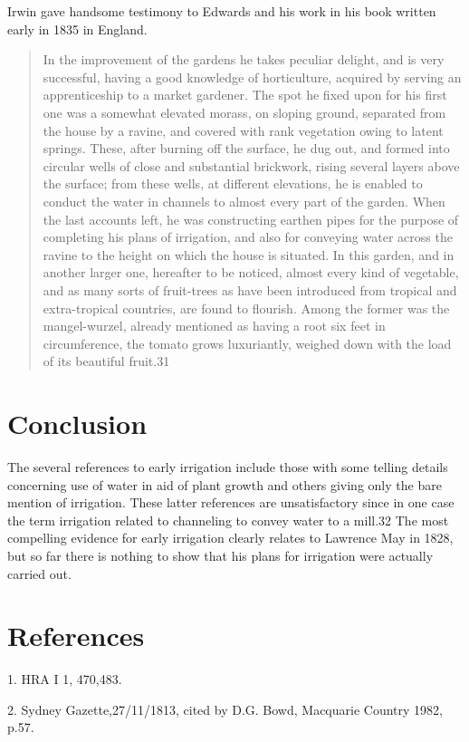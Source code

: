 Irwin gave handsome testimony to Edwards and his work in his book
written early in 1835 in England.
\begin{quote}
In the improvement of the gardens he takes peculiar delight, and is
very successful, having a good knowledge of horticulture, acquired by
serving an apprenticeship to a market gardener. The spot he fixed upon
for his first one was a somewhat elevated morass, on sloping ground,
separated from the house by a ravine, and covered with rank vegetation
owing to latent springs. These, after burning off the surface, he dug
out, and formed into circular wells of close and substantial
brickwork, rising several layers above the surface; from these wells,
at different elevations, he is enabled to conduct the water in
channels to almost every part of the garden. When the last accounts
left, he was constructing earthen pipes for the purpose of completing
his plans of irrigation, and also for conveying water across the
ravine to the height on which the house is situated. In this garden,
and in another larger one, hereafter to be noticed, almost every kind
of vegetable, and as many sorts of fruit-trees as have been introduced
from tropical and extra-tropical countries, are found to
flourish. Among the former was the mangel-wurzel, already mentioned as
having a root six feet in circumference, the tomato grows luxuriantly,
weighed down with the load of its beautiful fruit.31
\end{quote}

\section{Conclusion}

The several references to early irrigation include those with some
telling details concerning use of water in aid of plant growth and
others giving only the bare mention of irrigation. These latter
references are unsatisfactory since in one case the term irrigation
related to channeling to convey water to a mill.32 The most compelling
evidence for early irrigation clearly relates to Lawrence May in 1828,
but so far there is nothing to show that his plans for irrigation were
actually carried out.

\section{References}

1. HRA I 1, 470,483.

2. Sydney Gazette,27/11/1813, cited by D.G. Bowd, Macquarie Country
   1982, p.57.

